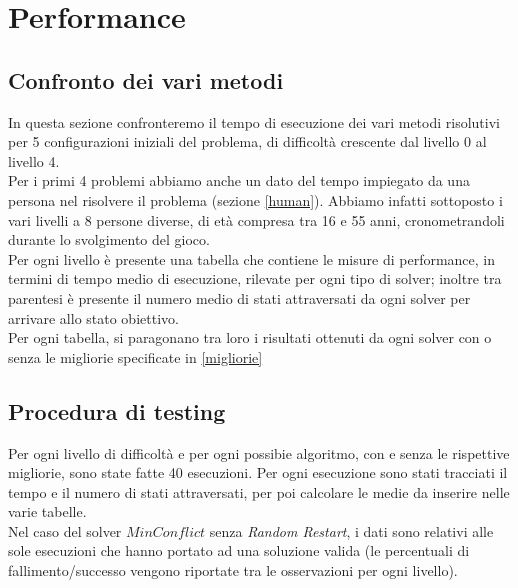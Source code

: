 
\chapter{Performance}
\label{cap:performance}
\section{Confronto dei vari metodi}
In questa sezione confronteremo il tempo di esecuzione dei vari metodi risolutivi per 5 configurazioni iniziali del problema, di difficoltà crescente dal livello 0 al livello 4.\\
Per i primi 4 problemi abbiamo anche un dato del tempo impiegato da una persona nel risolvere il problema (sezione \ref{human}). Abbiamo infatti sottoposto i vari livelli a 8 persone diverse, di età compresa tra 16 e 55 anni, cronometrandoli durante lo svolgimento del gioco.\\
Per ogni livello è presente una tabella che contiene le misure di performance, in termini di tempo medio di esecuzione, rilevate per ogni tipo di solver; inoltre tra parentesi è presente il numero medio di stati attraversati da ogni solver per arrivare allo stato obiettivo. \\
Per ogni tabella, si paragonano tra loro i risultati ottenuti da ogni solver con o senza le migliorie specificate in \ref{migliorie}

\section{Procedura di testing}
Per ogni livello di difficoltà e per ogni possibie algoritmo, con e senza le rispettive migliorie, sono state fatte 40 esecuzioni. Per ogni esecuzione sono stati tracciati il tempo e il numero di stati attraversati, per poi calcolare le medie da inserire nelle varie tabelle.\\

Nel caso del solver $MinConflict$ senza \textit{Random Restart}, i dati sono relativi alle sole esecuzioni che hanno portato ad una soluzione valida (le percentuali di fallimento/successo vengono riportate tra le osservazioni per ogni livello).

